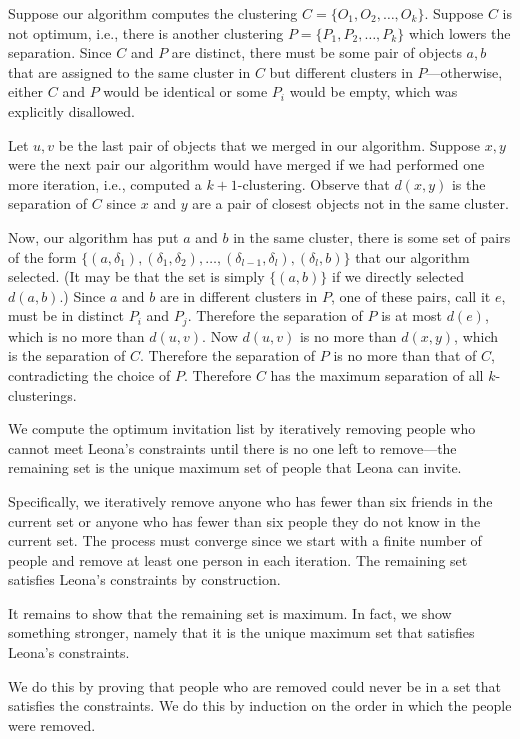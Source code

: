 Suppose our algorithm computes
the clustering $C = \{O_1,O_2,\ldots,O_k\}$.  Suppose $C$ is not optimum,
i.e., there is another clustering $P  = \{P_1,P_2,\ldots,P_k\}$ which lowers the separation.
Since $C$ and $P$ are distinct, there must be some pair of objects $a,b$
that are assigned to the same cluster in $C$ but different clusters in $P$---otherwise, either $C$ and $P$ would be identical or some $P_i$ would be empty, which was
explicitly disallowed.

Let $u,v$ be the last pair of objects that we merged in our algorithm.
Suppose $x,y$ were the next pair our algorithm would have merged if
we had performed one more iteration, i.e., computed a $k+1$-clustering.
Observe that $d(x,y)$ is the separation of $C$ since $x$ and $y$
are a pair of closest objects not in the same cluster.

Now, our algorithm has put $a$ and $b$ in the same cluster,
there is some set of pairs of the form $\{(a,\delta_1),
(\delta_1,\delta_2),\ldots,(\delta_{l-1},\delta_l), (\delta_l,b)\}$ that our algorithm selected.
(It may be that the set is simply $\{(a,b)\}$ if we directly selected $d(a,b)$.)
Since $a$ and $b$ are in different clusters in $P$, one of these pairs, call it $e$, must be
in distinct $P_i$ and $P_j$. Therefore the separation of $P$ is at most $d(e)$, which is
no more than $d(u,v)$. Now $d(u,v)$ is no more than $d(x,y)$, which is the
separation of $C$. Therefore the separation of $P$ is no more than that of $C$, contradicting the choice of $P$.
Therefore $C$ has the maximum separation of all $k$-clusterings. 

We compute the optimum invitation list by iteratively removing 
people who cannot meet Leona's constraints until there
is no one left to remove---the remaining set
is the unique maximum set of people that Leona can invite.

Specifically, we iteratively remove anyone who has fewer than six friends in the current set or anyone 
who has fewer than six people they do not know in the current set.
The process must converge since we start with a finite number of
people and remove at least one person in each iteration.
The remaining set satisfies Leona's constraints by construction.

It remains to show that the remaining set is maximum. 
In fact, we show something stronger, namely that it is the unique 
maximum set that satisfies Leona's constraints.

We do this by proving that people who are removed could never be 
in a set that satisfies the constraints.  We do this 
by induction on the order in which the people were removed.

